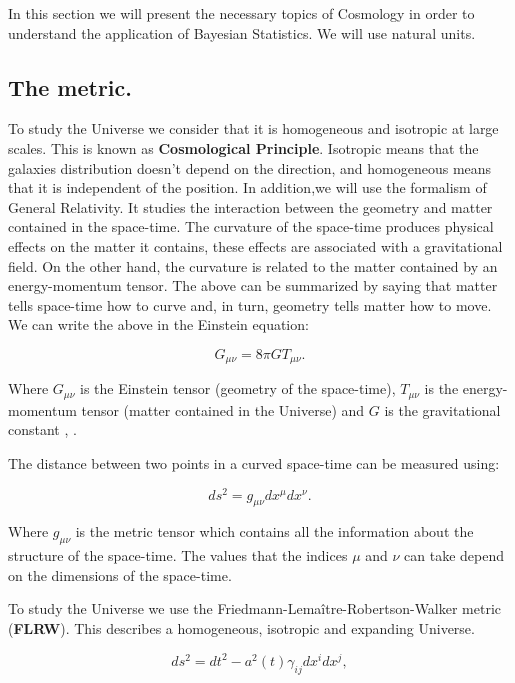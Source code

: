 \documentclass[onecolumn,           %
               showpacs,            %
               preprintnumbers,     %
               aps,                 %
               prl,          	    %
               letterpaper,             %
               superscriptaddress,      %
               nofootinbib,         %
               tightenlines,        %
               floats,floatfix      %
               ,usenatbib,
               ]{revtex4-1}
\begin{document}
In this section we will present the necessary topics of Cosmology in order to understand the application of Bayesian Statistics. We will use natural units.

\subsection{The metric.}
To study the Universe we consider that it is homogeneous and isotropic at large scales. This is known as \textbf{Cosmological Principle}. Isotropic means that the galaxies distribution doesn't depend on the direction, and homogeneous means that it is independent of the position. In addition,we will use the formalism of General Relativity. It studies the interaction between the geometry and matter contained in the space-time. The curvature of the space-time produces physical effects on the matter it contains, these effects are associated with a gravitational field. On the other hand, the curvature is related to the matter contained by an energy-momentum tensor. The above can be summarized by saying that matter tells space-time how to curve and, in turn, geometry tells matter how to move. We can write the above in the Einstein equation:

\begin{equation}
\label{einstein}
G_{\mu \nu} = 8\pi G T_{\mu \nu}.
\end{equation}

Where $G_{\mu \nu}$ is the Einstein tensor (geometry of the space-time), $T_{\mu \nu}$ is the energy-momentum tensor (matter contained in the Universe) and $G$ is the gravitational constant \cite{baumann}, \cite{wald}.

The distance between two points in a curved space-time can be measured using:

\begin{equation}
ds^2 = g_{\mu \nu}dx^{\mu}dx^{\nu}.
\end{equation}

Where $g_{\mu \nu}$ is the metric tensor which contains all the information about the structure of the space-time. The values that the indices $\mu$ and $\nu$ can take depend on the dimensions of the space-time.

To study the Universe we use the Friedmann-Lema\^itre-Robertson-Walker metric (\textbf{FLRW}). This describes a homogeneous, isotropic and expanding Universe.

\begin{equation}
\label{m2}
ds^2 = dt^2 -a^2(t)\gamma_{ij}dx^idx^j ,
\end{equation}
\end{document}

